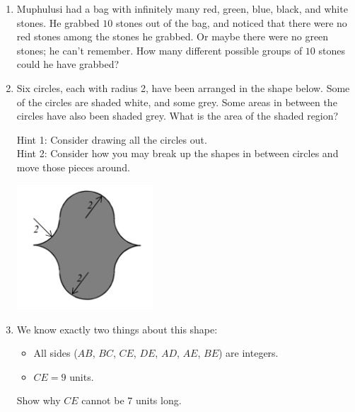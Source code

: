 \documentclass[12pt]{article}
\begin{document}
\begin{enumerate}[topsep=2\bigskipamount,itemsep=\bigskipamount]
\begin{multicols}{2}
    \begin{center}  \end{center}
\end{multicols}

\item Muphulusi had a bag with infinitely many red, green, blue, black, and white stones.
He grabbed $10$ stones out of the bag, and noticed that there were no red stones among the stones he grabbed.
Or maybe there were no green stones; he can't remember.
How many different possible groups of $10$ stones could he have grabbed?


\item
\begin{multicols}{2}
Six circles, each with radius 2, have been arranged in the shape below. Some of the circles are shaded white, and some grey. Some areas in between the circles have also been shaded grey. What is the area of the shaded region?

Hint 1: Consider drawing all the circles out.\\
Hint 2: Consider how you may break up the shapes in between circles and move those pieces around.

\centering
\includegraphics[width=0.4\textwidth]{sem.png}
\end{multicols}

\item
\begin{multicols}{2}
We know exactly two things about this shape:
\begin{itemize}
    \item [1.] All sides ($AB$, $BC$, $CE$, $DE$, $AD$, $AE$, $BE$) are integers.
    \item [2.] $CE = 9$ units.
\end{itemize}
Show why $CE$ cannot be $7$ units long.


\end{multicols}
\end{enumerate}
\end{document}
